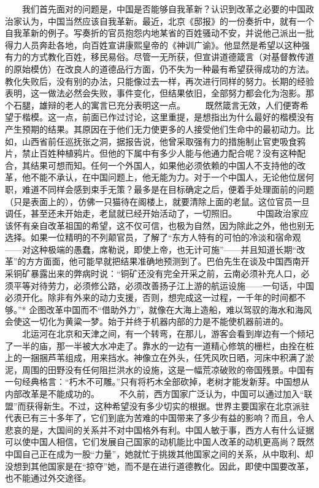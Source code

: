 \documentclass[12pt,oneside]{book}
\begin{document}
\begin{common-format}
　　我们首先面对的问题是，中国是否能够自我革新？认识到改革之必要的中国政治家认为，中国当然应该自我革新。最近，北京《邸报》的一份奏折中，就有一个自我革新的例子。写奏折的官员抱怨内地某省的百姓骚动不安，并说他己派出一批得力人员奔赴各地，向百姓宣讲康熙皇帝的《神训广谕》。他显然是希望以这种强有力的方式教化百姓，移民易俗。尽管一无所获，但宣讲道德箴言（对基督教传道的原始模仿）在改良人的道德品行方面，仍不失为一种最有希望获得成功的方法。教化失败后，没有别的办法，只能像过去一样，再次进行同样的努力。长期的经验表明，这一做法必然会失败，事件变化，但结果依旧，全部努力都会化为泡影。那个石腿，雄辩的老人的寓言已充分表明这一点。 
　　既然箴言无效，人们便寄希望于楷模。这一点，前面已作过讨论，这里重提，是想指出为什么最好的楷模没有产生预期的结果。其原因在于他们无力使更多的人接受他们生命中的最初动力。比如，山西省前任巡抚张之洞，据报告说，他曾采取强有力的措施制止官吏吸食鸦片，禁止百姓种植鸦片。但他的下属中有多少人能与他通力配合呢？没有这种配合，其结果可想而知。任何一个外国人，如果他必须依赖的中国人不支持他的改革，他不能不承认，在中国问题上，他无能为力。对于一个中国人，无论他位居何职，难道不同样会感到束手无策？最多是在目标确定之后，便着手处理面前的问题（只是表面上的），仿佛一只猫待在阁楼上，就要清除上面的老鼠。这位官员一旦调任，甚至还未开始走，老鼠就已经开始活动了，一切照旧。 
　　中国政治家应该怀有亲自改革祖国的希望，这不仅可信，也极为自然，因为除此之外，他也别无选择。如果一位精明的不列颠官员，了解了“东方人特有的可怕的冷淡和宿命观——对这种极端的愚蠢，席勒说，即使上帝，也无计可施”——并且知道长期“改革”的方方面面，他可能早就把结果准确地预测到了。巴伯先生在谈及中国西南开采铜矿暴露出来的弊病时说：“铜矿还没有完全开采之前，云南必须补充人口，必须平等对待劳力，必须修公路，必须改善扬子江上游的航运设施——一句话，中国必须开化。除非有外来的动力支援，否则，想完成这一过程，一千年的时间都不够。”* 企图改革中国而不“借助外力”，就像在大海上造船，难以驾驭的海水和海风会使这一切化为黄粱一梦。始于并终于机器内部的力是不能使机器前进的。 
　　北运河在北京和天津之间，有一个转弯，在那儿，游客会看到岸边有一个倾圮了一半的庙，那一半被大水冲走了。靠水的一边有一道精心修筑的栅栏，由拴在桩上的一捆捆芦苇组成，用来挡水。神像立在外头，任凭风吹日晒，河床中积满了淤泥，周围的田野没有任何阻拦洪水的设施，这是一幅荒凉破败的帝国残景。中国有一句经典格言：“朽木不可雕。”只有将朽木全部砍掉，老树才能发新芽。中国想从内部改革是不能成功的。 
　　不久前，西方国家广泛认为，中国可以通过加入“联盟”而获得新生。不过，这种希望没有多少切实的根据。世界主要国家在北京派驻代表已有三十多年了，它们到底为苦难的中国带来了多少有益的影响？而且，令人悲哀的是，大国间的关系并不对中国格外有利。中国人敏于事，西方人有什么证据可以使中国人相信，它们发展自己国家的动机能比中国人改革的动机更高尚？既然中国自己正在成为一股“力量”，她就忙于挑拨其他国家之间的关系，从中取利、却没想到其他国家是在“掠夺”她，而不是在进行道德教化。因此，即使中国要改革，也不能通过外交途径。 

\end{common-format}
\end{document}
